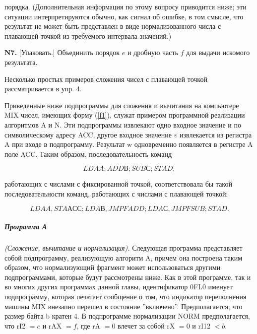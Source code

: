 {порядка. (Дополнительная информация по этому вопросу приводится ниже; эти ситуации интерпретируются обычно, как сигнал об ошибке, в том смысле, что результат не может быть представлен в виде нормализованного числа с плавающей точкой из требуемого интервала значений.)

\textbf{N7.} [Упаковать.] Объединить порядок $e$ и дробную часть $f$ для выдачи искомого результата.

Несколько простых примеров сложения чисел с плавающей точкой рассматривается в упр. 4.

Приведенные ниже подпрограммы для сложения и вычитания на компьютере MIX чисел, имеющих форму (\ref{f1}), служат примером программной реализации алгоритмов A и N. Эти подпрограммы извлекают одно входное значение и по символическому адресу ACC, другое входное значение $v$ извлекается из регистра A при входе в подпрограмму. Результат w одновременно появляется в регистре A поле ACC. Таким образом, последовательность команд

\begin{center}
\begin{equation}
LDA A; ADD В; SUB С; STA D,
\end{equation}
\end{center}
работающих с числами с фиксированной точкой, соответствовала бы такой последовательности команд, работающих с числами с плавающей точкой:
\begin{center}
\begin{equation}
LDA A, STA АСС; LDA В, JMP FADD; LDA С, JMP FSUB; STA D.
\end{equation}
\end{center}

\subparagraph{Программа А} \textit{(Сложение, вычитание и нормализация).} Следующая программа представляет собой подпрограмму, реализующую алгоритм A, причем она построена таким образом, что нормализующий фрагмент может использоваться другими 
подпрограммами, которые будут рассмотрены ниже. Как в этой программе, так и во многих других программах данной главы, идентификатор 0FL0 именует подпрограмму, которая печатает сообщение о том, что индикатор переполнения машины MIX внезапно перешел в состояние ''включено''. Предполагается, что размер байта b кратен 4. В подпрограмме нормализации NORM предполагается, что rI2 $= e$ и rAX $= f$, где rA $= 0$ влечет за собой rX $= 0$ и rI12 $< b$.

}

